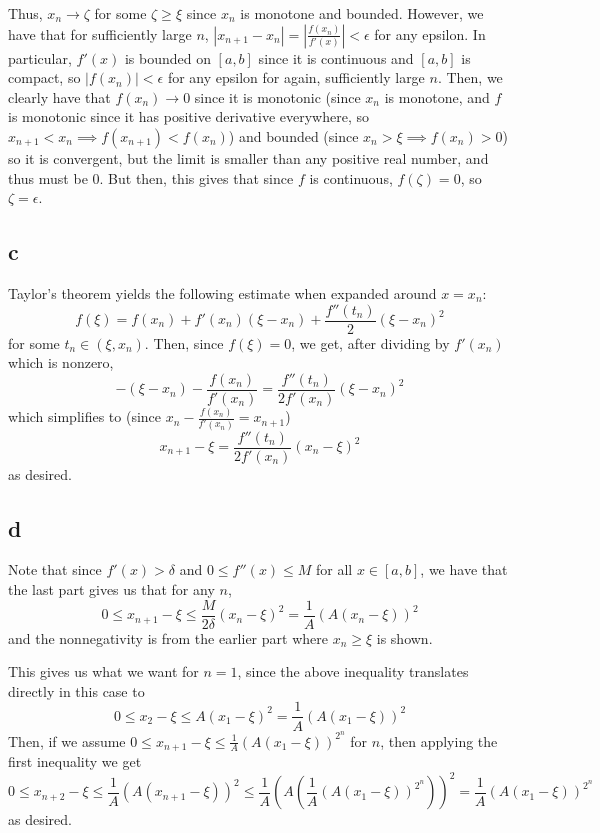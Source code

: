 \documentclass[12pt,letterpaper]{article}
\theoremstyle{definition}
\begin{document}
Thus, $x_{n} \rightarrow \zeta$ for some $\zeta \geq \xi$ since $x_{n}$ is monotone and bounded. However, we have that for sufficiently large $n$, $|x_{n+1} - x_{n}| = |\frac{f(x_{n})}{f'(x)}| < \epsilon$ for any epsilon. In particular, $f'(x)$ is bounded on $[a,b]$ since it is continuous and $[a,b]$ is compact, so $|f(x_{n})| < \epsilon$ for any epsilon for again, sufficiently large $n$. Then, we clearly have that $f(x_{n}) \rightarrow 0$ since it is monotonic (since $x_{n}$ is monotone, and $f$ is monotonic since it has positive derivative everywhere, so $x_{n+1} < x_{n} \implies f(x_{n+1}) < f(x_{n})$) and bounded (since $x_{n} > \xi \implies f(x_{n}) > 0$) so it is convergent, but the limit is smaller than any positive real number, and thus must be 0. But then, this gives that since $f$ is continuous, $f(\zeta) = 0$, so $\zeta = \epsilon$.

\subsection*{c}

Taylor's theorem yields the following estimate when expanded around $x = x_{n}$:
\[
  f(\xi) = f(x_{n}) + f'(x_{n})(\xi - x_{n}) + \frac{f''(t_{n})}{2}(\xi - x_{n})^{2}
\]
for some $t_{n} \in (\xi, x_{n})$. Then, since $f(\xi) = 0$, we get, after dividing by $f'(x_{n})$ which is nonzero,
\[
  -(\xi - x_{n}) - \frac{f(x_{n})}{f'(x_{n})} = \frac{f''(t_{n})}{2f'(x_{n})}(\xi - x_{n})^{2}
\]
which simplifies to (since $x_{n} - \frac{f(x_{n})}{f'(x_{n})} = x_{n+1}$)
\[
  x_{n+1} - \xi = \frac{f''(t_{n})}{2f'(x_{n})}(x_{n} - \xi)^{2}
\]
as desired.

\subsection*{d}


Note that since $f'(x) > \delta$ and $0 \leq f''(x) \leq M$ for all $x \in [a,b]$, we have that the last part gives us that for any $n$,
\[
  0 \leq x_{n+1} - \xi \leq \frac{M}{2\delta}(x_{n} - \xi)^{2} = \frac{1}{A}(A(x_{n} - \xi))^{2}
\]
and the nonnegativity is from the earlier part where $x_{n} \geq \xi$ is shown.

This gives us what we want for $n = 1$, since the above inequality translates directly in this case to
\[
  0 \leq x_{2} - \xi \leq A(x_{1} - \xi)^{2} = \frac{1}{A}(A(x_{1} - \xi))^{2}
\]
Then, if we assume $0 \leq x_{n+1} - \xi \leq \frac{1}{A}(A(x_{1} - \xi))^{2^{n}}$ for $n$, then applying the first inequality we get
\[
  0 \leq x_{n+2} - \xi \leq \frac{1}{A}(A(x_{n+1} - \xi))^{2} \leq \frac{1}{A}\left(A\left(\frac{1}{A}(A(x_{1} - \xi))^{2^{n}}\right)\right)^{2} = \frac{1}{A}(A(x_{1} - \xi))^{2^{n}}
\]
as desired.
\end{document}
